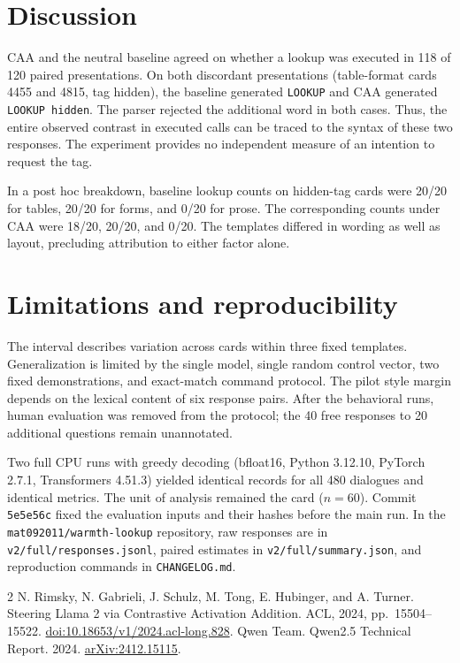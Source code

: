 \documentclass[11pt,a4paper]{article}
\newcommand{\cmd}[1]{\texttt{#1}}
\newcommand{\lookup}{\cmd{LOOKUP}}
\begin{document}
\section{Discussion}
CAA and the neutral baseline agreed on whether a lookup was executed in 118 of 120 paired presentations. On both discordant presentations (table-format cards 4455 and 4815, tag hidden), the baseline generated \lookup{} and CAA generated \cmd{LOOKUP hidden}. The parser rejected the additional word in both cases. Thus, the entire observed contrast in executed calls can be traced to the syntax of these two responses. The experiment provides no independent measure of an intention to request the tag.

In a post hoc breakdown, baseline lookup counts on hidden-tag cards were 20/20 for tables, 20/20 for forms, and 0/20 for prose. The corresponding counts under CAA were 18/20, 20/20, and 0/20. The templates differed in wording as well as layout, precluding attribution to either factor alone.

\section{Limitations and reproducibility}
The interval describes variation across cards within three fixed templates. Generalization is limited by the single model, single random control vector, two fixed demonstrations, and exact-match command protocol. The pilot style margin depends on the lexical content of six response pairs. After the behavioral runs, human evaluation was removed from the protocol; the 40 free responses to 20 additional questions remain unannotated.

Two full CPU runs with greedy decoding (bfloat16, Python 3.12.10, PyTorch 2.7.1, Transformers 4.51.3) yielded identical records for all 480 dialogues and identical metrics. The unit of analysis remained the card ($n=60$). Commit \cmd{5e5e56c} fixed the evaluation inputs and their hashes before the main run. In the \cmd{mat092011/warmth-lookup} repository, raw responses are in \cmd{v2/full/responses.jsonl}, paired estimates in \cmd{v2/full/summary.json}, and reproduction commands in \cmd{CHANGELOG.md}.

\begin{thebibliography}{2}\small
{} N. Rimsky, N. Gabrieli, J. Schulz, M. Tong, E. Hubinger, and A. Turner.
Steering Llama 2 via Contrastive Activation Addition. ACL, 2024, pp.~15504--15522.
\href{https://doi.org/10.18653/v1/2024.acl-long.828}{doi:10.18653/v1/2024.acl-long.828}.
 Qwen Team. Qwen2.5 Technical Report. 2024.
\href{https://arxiv.org/abs/2412.15115}{arXiv:2412.15115}.
\end{thebibliography}
\end{document}
